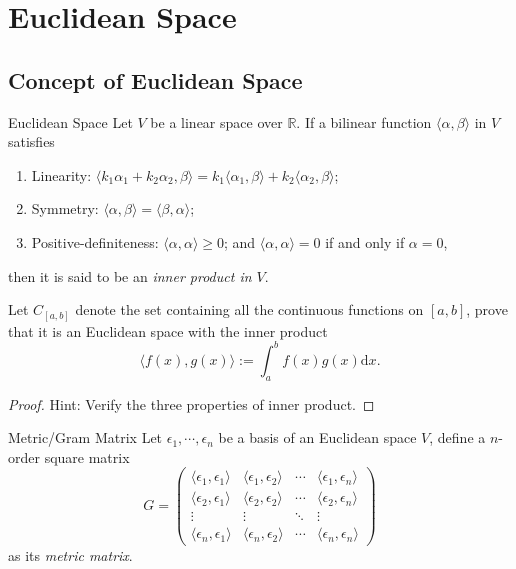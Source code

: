 
\section{Euclidean Space}

\subsection{Concept of Euclidean Space}

\begin{definition}{Euclidean Space}{}
  Let $V$ be a linear space over $\mathbb{R}$.
  If a bilinear function $\langle \alpha, \beta \rangle$ in $V$ satisfies
  \begin{enumerate}
  \item Linearity: $\langle k_1\alpha_1 + k_2\alpha_2, \beta \rangle = k_1
    \langle \alpha_1, \beta\rangle + k_2 \langle \alpha_2, \beta \rangle$;
  \item Symmetry: $\langle \alpha, \beta \rangle = \langle \beta, \alpha \rangle$;
  \item Positive-definiteness: $\langle \alpha, \alpha \rangle \geq 0$;
    and $\langle \alpha, \alpha \rangle = 0$ if and only
    if $\alpha = 0$,
  \end{enumerate}
  then it is said to be an \emph{inner product in $V$}.
\end{definition}

\begin{example}{}{}
  Let $C_{[a,b]}$ denote the set containing all the continuous functions on $[a,
  b]$, prove that it is an Euclidean space with the inner product 
  \begin{equation}
    \langle f(x), g(x) \rangle := \int_a^b f(x)g(x)\mathrm{d} x.
  \end{equation}
\end{example}

\begin{proof}
  Hint: Verify the three properties of inner product.
\end{proof}

\begin{definition}{Metric/Gram Matrix}
  Let $\epsilon_1,\cdots,\epsilon_n$ be a basis of an Euclidean space $V$,
  define a $n$-order square matrix
  \begin{equation}
    G = \begin{pmatrix}
      \langle\epsilon_1,\epsilon_1\rangle & \langle\epsilon_1,\epsilon_2\rangle & \cdots & \langle\epsilon_1,\epsilon_n\rangle \\
      \langle\epsilon_2,\epsilon_1\rangle & \langle\epsilon_2,\epsilon_2\rangle & \cdots & \langle\epsilon_2,\epsilon_n\rangle \\
      \vdots & \vdots & \ddots & \vdots \\
      \langle\epsilon_n,\epsilon_1\rangle & \langle\epsilon_n,\epsilon_2\rangle & \cdots & \langle\epsilon_n,\epsilon_n\rangle
    \end{pmatrix}
  \end{equation}
  as its \emph{metric matrix}.
\end{definition}

